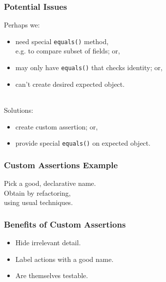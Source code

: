 \documentclass{beamer}
\newenvironment{changemargin}[1]{%
  \begin{list}{}{%
    \setlength{\topsep}{0pt}%
    \setlength{\leftmargin}{#1}%
    \setlength{\rightmargin}{1em}
    \setlength{\listparindent}{\parindent}%
    \setlength{\itemindent}{\parindent}%
    \setlength{\parsep}{\parskip}%
  }%
  \item[]}{\end{list}}
\begin{document}
\begin{frame}
  \frametitle{Potential Issues}
  \begin{changemargin}{1.5cm}
    Perhaps we:
    \begin{itemize}
    \item need special {\tt equals()} method, \\
      e.g. to compare subset of fields; or,
    \item may only have {\tt equals()} that checks identity; or,
    \item can't create desired expected object.
    \end{itemize}
    ~\\
    Solutions:
    \begin{itemize}
    \item create custom assertion; or,
    \item provide special {\tt equals()} on expected object.
    \end{itemize}
  \end{changemargin}
\end{frame}

\begin{frame}
  \frametitle{Custom Assertions Example}
  \begin{changemargin}{.5cm}
    \small
    
  \end{changemargin}

  \begin{changemargin}{2cm}
    \Large
    Pick a good, declarative name.\\
    Obtain by refactoring, \\ \hspace*{2cm} using usual techniques.
  \end{changemargin}
\end{frame}

\begin{frame}
  \frametitle{Benefits of Custom Assertions}

  \begin{changemargin}{2cm}
    \Large
    \begin{itemize}
      \item Hide irrelevant detail.
        \item Label actions with a good name.
        \item Are themselves testable.
    \end{itemize}
  \end{changemargin}
\end{frame}
\end{document}
